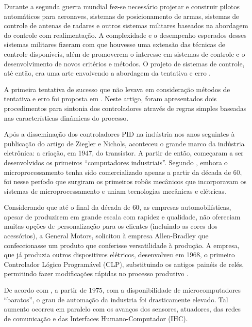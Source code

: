 Durante a segunda guerra mundial fez-se necessário projetar e construir pilotos
automáticos para aeronaves, sistemas de posicionamento de armas, sistemas de
controle de antenas de radares e outros sistemas militares baseados na abordagem
do controle com realimentação. A complexidade e o desempenho esperados desses
sistemas militares fizeram com que houvesse uma extensão das técnicas de
controle disponíveis, além de promoverem o interesse em sistemas de controle e o
desenvolvimento de novos critérios e métodos. O projeto de sistemas de controle,
até então, era uma arte envolvendo a abordagem da tentativa e erro
\cite{dorf:2009}.

A primeira tentativa de sucesso que não levava em consideração métodos de
tentativa e erro foi proposta em . Neste artigo, foram
apresentados dois procedimentos para sintonia dos controladores através de
regras simples baseadas nas características dinâmicas do processo.

Após a disseminação dos controladores PID na indústria nos anos seguintes à
publicação do artigo de Ziegler e Nichols, aconteceu o grande marco da indústria
eletrônica: a criação, em 1947, do transistor. A partir de então, começaram a
ser desenvolvidos os primeiros ``computadores industriais''. Segundo
, embora o microprocessamento tenha sido comercializado
apenas a partir da década de 60, foi nesse período que surgiram os primeiros
robôs mecânicos que incorporavam os sistemas de microprocessamento e uniam
tecnologias mecânicas e elétricas.

Considerando que até o final da década de 60, as empresas automobilísticas,
apesar de produzirem em grande escala com rapidez e qualidade, não ofereciam
muitas opções de personalização para os clientes (incluindo as cores dos
acessórios), a General Motors, solicitou à empresa Allen-Bradley que
confeccionasse um produto que conferisse versatilidade à produção. A empresa, que
já produzia outros dispositivos elétricos, desenvolveu em 1968, o primeiro
Controlador Lógico Programável (CLP), substituindo os antigos painéis de relés,
permitindo fazer modificações rápidas no processo produtivo \cite{goeking:2010}.


De acordo com , a partir de 1975, com a
disponibilidade de microcomputadores ``baratos'', o grau de automação da
industria foi drasticamente elevado. Tal aumento ocorreu em paralelo com os
avanços dos sensores, atuadores, das redes de comunicação e das Interfaces
Humano-Computador (IHC).

